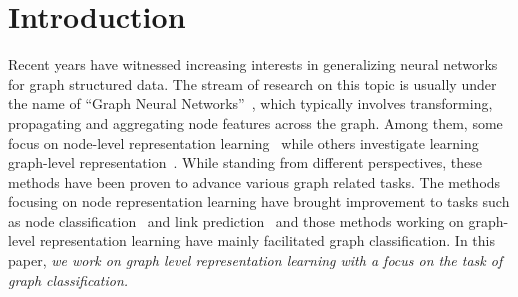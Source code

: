 \documentclass[sigconf]{acmart}
\begin{document}
\maketitle

\section{Introduction}

Recent years have witnessed increasing interests in generalizing neural networks for graph structured data. The stream of research on this topic is usually under the name of ``Graph Neural Networks''~\cite{scarselli2009graph}, which typically involves transforming, propagating and aggregating node features across the graph. Among them, some focus on node-level representation learning~\cite{kipf2016semi,hamilton2017inductive,schlichtkrull2018modeling} while others investigate learning graph-level representation~\cite{li2015gated,henaff2015deep,duvenaud2015convolutional,defferrard2016convolutional,bruna2013spectral,ying2018hierarchical,gao2019graph1,gao2019graph2}. While standing from different perspectives, these methods have been proven to advance various graph related tasks. The methods focusing on node representation learning have brought improvement to tasks such as node classification~\cite{kipf2016semi,hamilton2017inductive,schlichtkrull2018modeling,gao2018large,gao2019graph1,gao2019graph2} and link prediction~\cite{schlichtkrull2018modeling} and those methods working on graph-level representation learning have mainly facilitated graph classification. In this paper, {\it we work on graph level representation learning with a focus on the task of graph classification.} 
 
\end{document}
